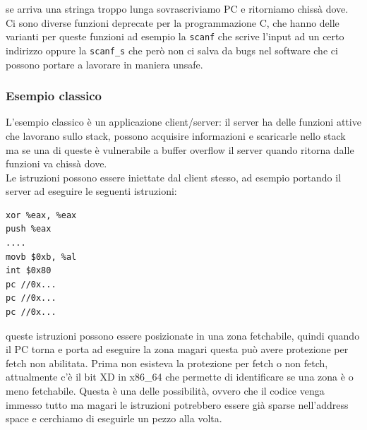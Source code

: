 \documentclass[12pt, oneside]{extbook}
\begin{document}
se arriva una stringa troppo lunga sovrascriviamo PC e ritorniamo chissà dove.\\Ci sono diverse funzioni deprecate per la programmazione C, che hanno delle varianti per queste funzioni ad esempio la \texttt{scanf} che scrive l'input ad un certo indirizzo oppure la \texttt{scanf\_s} che però non ci salva da bugs nel software che ci possono portare a lavorare in maniera unsafe.\\
\subsubsection{Esempio classico}
L'esempio classico è un applicazione client/server: il server ha delle funzioni attive che lavorano sullo stack, possono acquisire informazioni e scaricarle nello stack ma se una di queste è vulnerabile a buffer overflow il server quando ritorna dalle funzioni va chissà dove.\\Le istruzioni possono essere iniettate dal client stesso, ad esempio portando il server ad eseguire le seguenti istruzioni:
\begin{lstlisting}
xor %eax, %eax
push %eax
....
movb $0xb, %al
int $0x80
pc //0x...
pc //0x...
pc //0x...
\end{lstlisting}
queste istruzioni possono essere posizionate in una zona fetchabile, quindi quando il PC torna e porta ad eseguire la zona magari questa può avere protezione per fetch non abilitata. Prima non esisteva la protezione per fetch o non fetch, attualmente c'è il bit XD in x86\_64 che permette di identificare se una zona è o meno fetchabile. Questa è una delle possibilità, ovvero che il codice venga immesso tutto ma magari le istruzioni potrebbero essere già sparse nell'address space e cerchiamo di eseguirle un pezzo alla volta.
\end{document}
